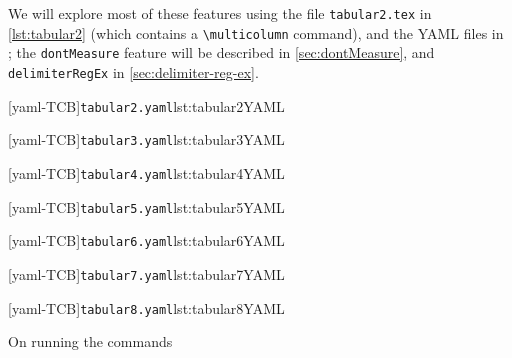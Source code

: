  \begin{example}
 We will explore most of these features using the file \texttt{tabular2.tex} in
 \cref{lst:tabular2} (which contains a \lstinline!\multicolumn! command), and the YAML
 files in ; the \texttt{dontMeasure}
 feature will be described in \cref{sec:dontMeasure}, and \texttt{delimiterRegEx} in
 \cref{sec:delimiter-reg-ex}.

 \begin{minipage}{.45\textwidth}
  [yaml-TCB]{\texttt{tabular2.yaml}}{lst:tabular2YAML}
 \end{minipage}%
 \hfill
 \begin{minipage}{.48\textwidth}
  [yaml-TCB]{\texttt{tabular3.yaml}}{lst:tabular3YAML}
 \end{minipage}%

 \begin{minipage}{.45\textwidth}
  [yaml-TCB]{\texttt{tabular4.yaml}}{lst:tabular4YAML}
 \end{minipage}%
 \hfill
 \begin{minipage}{.48\textwidth}
  [yaml-TCB]{\texttt{tabular5.yaml}}{lst:tabular5YAML}
 \end{minipage}%

 \begin{minipage}{.45\textwidth}
  [yaml-TCB]{\texttt{tabular6.yaml}}{lst:tabular6YAML}
 \end{minipage}%
 \hfill
 \begin{minipage}{.48\textwidth}
  [yaml-TCB]{\texttt{tabular7.yaml}}{lst:tabular7YAML}
 \end{minipage}%

 \begin{minipage}{.48\textwidth}
  [yaml-TCB]{\texttt{tabular8.yaml}}{lst:tabular8YAML}
 \end{minipage}%

 On running the commands  


\end{example}
